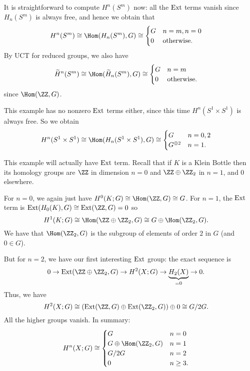 \begin{example}
	It is straightforward to compute $H^n(S^m)$ now:
	all the $\operatorname{Ext}$ terms vanish since $H_n(S^m)$ is always free,
	and hence we obtain that 
	\[ H^n(S^m) \cong \Hom(H_n(S^m), G) \cong
		\begin{cases}
			G & n=m, n=0 \\
			0 & \text{otherwise}.
		\end{cases}
	\]
	By UCT for reduced groups, we also have
	\[ \wt H^n(S^m) \cong \Hom(\wt H_n(S^m), G) \cong
		\begin{cases}
			G & n=m \\
			0 & \text{otherwise}.
		\end{cases}
	\]
	since $\Hom(\ZZ, G)$.
\end{example}

\begin{example}
	This example has no nonzero $\operatorname{Ext}$ terms either,
	since this time $H^n(S^1 \times S^1)$ is always free.
	So we obtain
	\[ H^n(S^1 \times S^1) \cong \Hom(H_n(S^1 \times S^1), G)
		\cong
		\begin{cases}
			G & n = 0,2 \\
			G^{\oplus 2} & n = 1.
		\end{cases}
	\]
\end{example}

\begin{example}
	This example will actually have $\operatorname{Ext}$ term.
	Recall that if $K$ is a Klein Bottle then its homology groups are
	$\ZZ$ in dimension $n=0$ and $\ZZ \oplus \Zc 2$ in $n=1$, and $0$ elsewhere.

	For $n=0$, we again just have $H^0(K;G) \cong \Hom(\ZZ, G) \cong G$.
	For $n=1$, the $\operatorname{Ext}$ term is $\Ext(H_0(K), G) \cong \Ext(\ZZ, G) = 0$
	so \[ H^1(K;G) \cong \Hom(\ZZ \oplus \Zc2, G) \cong G \oplus \Hom(\Zc2, G). \]
	We have that $\Hom(\Zc2,G)$ is the subgroup
	of elements of order $2$ in $G$ (and $0 \in G$).

	But for $n=2$, we have our first interesting $\operatorname{Ext}$ group:
	the exact sequence is
	\[ 0 \to \Ext(\ZZ \oplus \Zc 2, G) \to H^2(X;G) \to \underbrace{H_2(X)}_{=0} \to 0. \]
	Thus, we have
	\[ H^2(X;G) \cong \left( \Ext(\ZZ,G) \oplus \Ext(\Zc2,G) \right) \oplus 0
		\cong G/2G. \]
	All the higher groups vanish.
	In summary:
	\[
		H^n(X;G) \cong
		\begin{cases}
			G & n = 0 \\
			G \oplus \Hom(\Zc2, G) & n = 1 \\
			G/2G & n = 2 \\
			0 & n \ge 3. 
		\end{cases}
	\]
\end{example}


